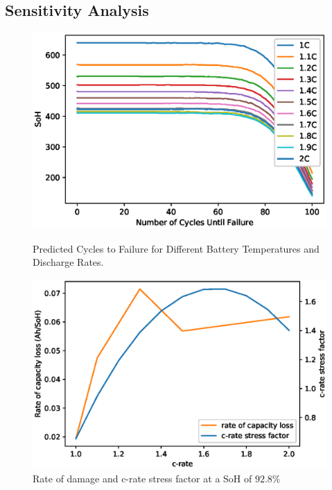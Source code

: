 \documentclass[a4paper, 10pt]{article}
\numberwithin{equation}{section}
\begin{document}
\subsection{Sensitivity Analysis}
\begin{figure}[h]
\centering
\begin{minipage}{.5\textwidth}
  \centering
    \includegraphics[width=0.95\linewidth]{images/F9_Sen.eps}
    \caption{Predicted Cycles to Failure for Different Battery Temperatures and Discharge Rates.}
    \label{fig:TC}
\end{minipage}%
\begin{minipage}{.5\textwidth}
  \centering
    \includegraphics[width=0.95\linewidth]{images/F10_Sig_Dam.eps}
    \caption{Rate of damage and c-rate stress factor at a SoH of $92.8\%$}
    \label{fig:damage_sigma}
\end{minipage}
\end{figure}

\end{document}
